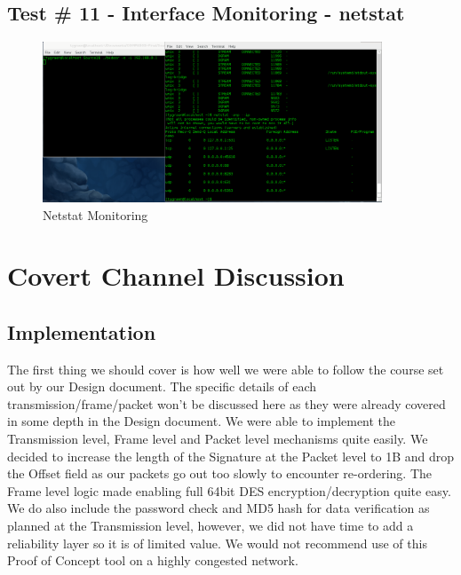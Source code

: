 \documentclass[titlepage]{article}
\begin{document}
\clearpage

\subsection{Test \# 11 - Interface Monitoring - netstat}

\begin{figure}[htb]                                                                       
  \begin{center}
    \includegraphics[width=0.9\textwidth]{Pictures/netstat.png}
  \end{center}
  \caption{Netstat Monitoring}
  \label{fig:netstat}
\end{figure}

\clearpage

\section{Covert Channel Discussion}

\subsection{Implementation}

The first thing we should cover is how well we were able to follow the course set out by our Design document.  The specific details of each transmission/frame/packet won't be discussed here as they were already covered in some depth in the Design document. We were able to implement the Transmission level, Frame level and Packet level mechanisms quite easily.  We decided to increase the length of the Signature at the Packet level to 1B and drop the Offset field as our packets go out too slowly to encounter re-ordering.  The Frame level logic made enabling full 64bit DES encryption/decryption quite easy.  We do also include the password check and MD5 hash for data verification as planned at the Transmission level, however, we did not have time to add a reliability layer so it is of limited value. We would not recommend use of this Proof of Concept tool on a highly congested network.
\end{document}
